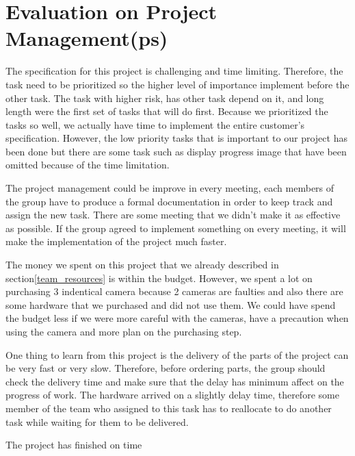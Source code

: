 \section{Evaluation on Project Management(ps)}

The specification for this project is challenging and time limiting.
Therefore, the task need to be prioritized so the higher level of importance implement before the other task.
The task with higher risk, has other task depend on it, and long length were the first set of tasks that will do first.
Because we prioritized the tasks so well, we actually have time to implement the entire customer's specification.
However, the low priority tasks that is important to our project has been done but there are some task such as display progress image that have been omitted because of the time limitation.

The project management could be improve in every meeting, each members of the group have to produce a formal documentation in order to keep track and assign the new task.
There are some meeting that we didn't make it as effective as possible.
If the group agreed to implement something on every meeting, it will make the implementation of the project much faster. 

The money we spent on this project that we already described in section\ref{team_resources} is within the budget.
However, we spent a lot on purchasing 3 indentical camera because 2 cameras are faulties and also there are some hardware that we purchased and did not use them.
We could have spend the budget less if we were more careful with the cameras, have a precaution when using the camera and more plan on the purchasing step.

One thing to learn from this project is the delivery of the parts of the project can be very fast or very slow. 
Therefore, before ordering parts, the group should check the delivery time and make sure that the delay has minimum affect on the progress of work.
The hardware arrived on a slightly delay time, therefore some member of the team who assigned to this task has to reallocate to do another task while waiting for them to be delivered.

The project has finished on time 













